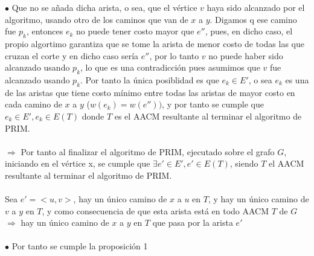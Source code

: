 \documentclass{article}
\begin{document}
    $\bullet$ Que no se a\~nada dicha arista, o sea, que el v\'ertice $v$ haya sido alcanzado por el algoritmo, usando otro de los caminos que van de $x$ a $y$.
    Digamos q ese camino fue $p_k$, entonces $e_k$ no puede tener costo mayor que $e''$, pues, en dicho caso, el propio algortimo garantiza que se tome la arista de menor costo
    de todas las que cruzan el corte y en dicho caso ser\'ia $e''$, por lo tanto $v$ no puede haber sido alcanzado usando $p_k$, lo que es una contradicci\'on pues asumimos que $v$
    fue alcanzado usando $p_k$. Por tanto la \'unica posiblidad es que $e_k \in E'$, o sea $e_k$ es una de las aristas que tiene costo m\'inimo entre todas las aristas
    de mayor costo en cada camino de $x$ a $y$ ($w(e_k) = w(e''))$, y por tanto se cumple que $e_k \in E', e_k \in E(T)$ donde $T$ es el AACM resultante al terminar el algoritmo de PRIM.\\\\

    $\Rightarrow$ Por tanto al finalizar el algoritmo de PRIM, ejecutado sobre  el grafo $G$, iniciando en el v\'ertice x, se cumple que 
    $\exists e' \in E', e' \in E(T)$, siendo $T$ el AACM resultante al terminar el algoritmo de PRIM.\\\\

    Sea $e' = <u,v>$, hay un \'unico camino de $x$ a $u$ en $T$, y hay un \'unico camino de $v$ a $y$ en $T$, y como consecuencia de que esta arista est\'a en todo AACM $T$ de $G$
    $\Rightarrow$ hay un \'unico camino de $x$ a $y$ en $T$ que pasa por la arista $e'$\\\\

    $\bullet$ Por tanto se cumple la proposici\'on 1\\\\
\end{document}

